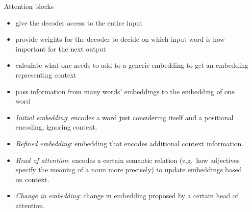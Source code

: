 Attention blocks
\begin{itemize}
    \item give the decoder access to the entire input 
    \item provide weights for the decoder to decide on which input word is how important for the next output
    \item calculate what one needs to add to a generic embedding to get an embedding representing context
    \item pass information from many words' embeddings to the embedding of one word
\end{itemize}

\newpar{}
\begin{itemize}
    \item \textit{Initial embedding}: encodes a word just considering itself and a positional encoding, ignoring context.
    \item \textit{Refined embedding}: embedding that encodes additional context information.
    \item \textit{Head of attention}: encodes a certain semantic relation (e.g.\ how adjectives specify the meaning of a noun more precisely) to update embeddings based on context.
    \item \textit{Change in embedding}: change in embedding proposed by a certain head of attention.
\end{itemize}

